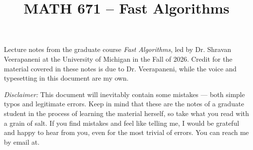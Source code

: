 \documentclass[a4paper,11pt]{article}
\title{MATH 671 -- Fast Algorithms\vspace{-3em}}
\date{}
\begin{document}

    \maketitle

    Lecture notes from the graduate course \textit{Fast Algorithms}, led by 
    Dr. Shravan Veerapaneni at the University of Michigan in the Fall of 2026. 
    Credit for the material covered in these notes is due to Dr. Veerapaneni, 
    while the voice and typesetting in this document are my own.

    \textit{Disclaimer:} This document will inevitably contain some mistakes --- both 
    simple typos and legitimate errors. Keep in mind that these are the notes 
    of a graduate student in the process of learning the material herself, so 
    take what you read with a grain of salt. If you find mistakes and feel like
    telling me, I would be grateful and happy to hear from you, even for the 
    most trivial of errors. You can reach me by email at.

    \restoregeometry
    \newpage

    \tableofcontents
    
\end{document}
